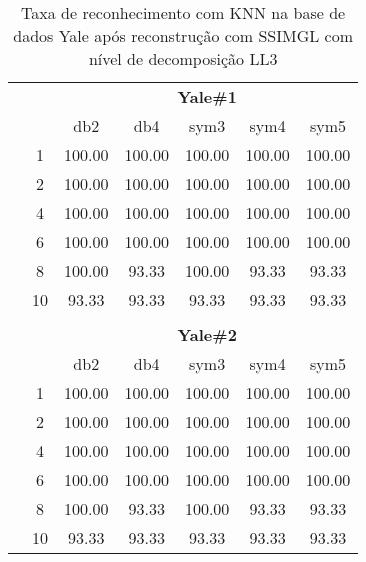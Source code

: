 \begin{table}[H]
	\centering
    \normalsize
	\caption{Taxa de reconhecimento com KNN na base de dados Yale após reconstrução com SSIMGL com nível de decomposição LL3}
	\begin{tabular}{|c|c|c c c c c|}
\cline{3-7}
\multicolumn{2}{c|}{\multirow{2}{*}{}} & \multicolumn{5}{c|}{\textbf{Yale\#1}}  \\\cline{3-7}

\multicolumn{2}{c|}{}  & db2 & db4 & sym3 & sym4 & sym5 \\\hline


\multicolumn{1}{|c|}{ \multirow{6}{*}{\rotatebox[origin=c]{90}{\textbf{K-vizinhos}}} }
&1	&100.00	&100.00&	100.00&	100.00	&100.00 \\\cline{2-7}
&2	&100.00	&100.00&	100.00&	100.00	&100.00 \\\cline{2-7}
&4	&100.00	&100.00&	100.00&	100.00	&100.00 \\\cline{2-7}
&6	&100.00	&100.00&	100.00&	100.00	&100.00 \\\cline{2-7}
&8	&100.00&93.33&	100.00&93.33	&93.33\\\cline{2-7}
&10	&93.33&	93.33&	93.33&	93.33&	93.33\\\midrule



\multicolumn{7}{c}{}\\ 


\cline{3-7}
\multicolumn{2}{c|}{\multirow{2}{*}{}} & \multicolumn{5}{c|}{\textbf{Yale\#2}}  \\\cline{3-7}

\multicolumn{2}{c|}{}  & db2 & db4 & sym3 & sym4 & sym5 \\\hline

\multicolumn{1}{|c|}{ \multirow{6}{*}{\rotatebox[origin=c]{90}{\textbf{K-vizinhos}}} }

&1	&100.00	&100.00&	100.00&	100.00  &100.00 \\\cline{2-7}
&2	&100.00	&100.00&	100.00&	100.00	&100.00 \\\cline{2-7}
&4	&100.00	&100.00&	100.00&	100.00	&100.00 \\\cline{2-7}
&6	&100.00	&100.00&	100.00&	100.00	&100.00 \\\cline{2-7}
&8	&100.00&93.33&	100.00&93.33	&93.33\\\cline{2-7}
&10	&93.33&	93.33&	93.33&	93.33&	93.33\\\midrule
\end{tabular}
\end{table}




